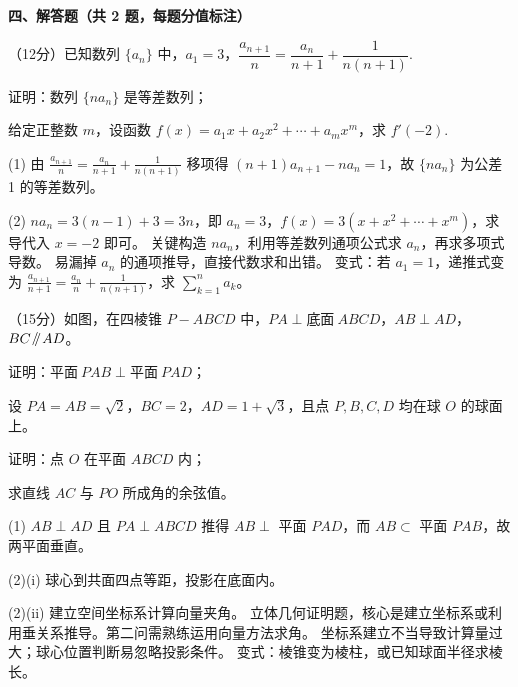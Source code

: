 \noindent\textbf{四、解答题（共 2 题，每题分值标注）}
\begin{examenum}[itemsep=\saqItemSep]

    \item （12分）已知数列 $\{a_n\}$ 中，$a_1=3$，$\dfrac{a_{n+1}}{n}=\dfrac{a_n}{n+1}+\dfrac{1}{n(n+1)}$.
    \begin{examenum}
        \item 证明：数列 $\{na_n\}$ 是等差数列；
        \item 给定正整数 $m$，设函数 $f(x)=a_1x+a_2x^2+\cdots+a_mx^m$，求 $f'(-2)$.
    \end{examenum}
    \begin{solution}
        \jieti (1) 由 $\frac{a_{n+1}}{n}=\frac{a_n}{n+1}+\frac{1}{n(n+1)}$ 移项得 $(n+1)a_{n+1}-na_n=1$，故 $\{na_n\}$ 为公差 1 的等差数列。\par
        (2) $na_n = 3(n-1)+3 = 3n$，即 $a_n=3$，$f(x)=3(x+x^2+\cdots+x^m)$，求导代入 $x=-2$ 即可。
        \xijie 关键构造 $na_n$，利用等差数列通项公式求 $a_n$，再求多项式导数。
        \cuowu 易漏掉 $a_n$ 的通项推导，直接代数求和出错。
        \jufa 变式：若 $a_1=1$，递推式变为 $\frac{a_{n+1}}{n+1}=\frac{a_n}{n}+\frac{1}{n(n+1)}$，求 $\sum_{k=1}^n a_k$。
    \end{solution}

    \item （15分）如图，在四棱锥 $P-ABCD$ 中，$PA\perp \text{底面}\ ABCD$，$AB\perp AD$，$BC\Parallel AD$。
    \begin{examenum}
        \item 证明：$\text{平面}\ PAB\perp \text{平面}\ PAD$；
        \item 设 $PA=AB=\sqrt{2}$，$BC=2$，$AD=1+\sqrt{3}$，且点 $P,B,C,D$ 均在球 $O$ 的球面上。
        \begin{examenum}
            \item 证明：点 $O$ 在平面 $ABCD$ 内；
            \item 求直线 $AC$ 与 $PO$ 所成角的余弦值。
        \end{examenum}
    \end{examenum}
    \begin{solution}
        \jieti (1) $AB\perp AD$ 且 $PA\perp ABCD$ 推得 $AB\perp$ 平面 $PAD$，而 $AB\subset$ 平面 $PAB$，故两平面垂直。\par
        (2)(i) 球心到共面四点等距，投影在底面内。\par
        (2)(ii) 建立空间坐标系计算向量夹角。
        \xijie 立体几何证明题，核心是建立坐标系或利用垂关系推导。第二问需熟练运用向量方法求角。
        \cuowu 坐标系建立不当导致计算量过大；球心位置判断易忽略投影条件。
        \jufa 变式：棱锥变为棱柱，或已知球面半径求棱长。
    \end{solution}

\end{examenum}
\fi

